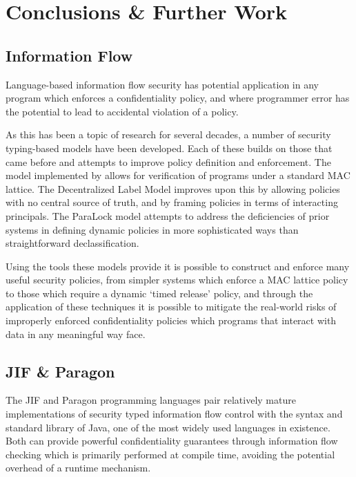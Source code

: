 \chapter{Conclusions \& Further Work} \label{chap_further_work}

\section{Information Flow}

Language-based information flow security has potential application in any program which enforces a confidentiality policy, and where programmer error has the potential to lead to accidental violation of a policy.

As this has been a topic of research for several decades, a number of security typing-based models have been developed. Each of these builds on those that came before and attempts to improve policy definition and enforcement. The model implemented by \citeauthor{denning1977certification} \cite{denning1977certification} allows for verification of programs under a standard MAC lattice. The Decentralized Label Model improves upon this by allowing policies with no central source of truth, and by framing policies in terms of interacting principals. The ParaLock model \cite{broberg2010paralocks} attempts to address the deficiencies of prior systems in defining dynamic policies in more sophisticated ways than straightforward declassification.

Using the tools these models provide it is possible to construct and enforce many useful security policies, from simpler systems which enforce a MAC lattice policy to those which require a dynamic `timed release' policy, and through the application of these techniques it is possible to mitigate the real-world risks of improperly enforced confidentiality policies which programs that interact with data in any meaningful way face.

\section{JIF \& Paragon}

The JIF and Paragon programming languages pair relatively mature implementations of security typed information flow control with the syntax and standard library of Java, one of the most widely used languages in existence. Both can provide powerful confidentiality guarantees through information flow checking which is primarily performed at compile time, avoiding the potential overhead of a runtime mechanism.

